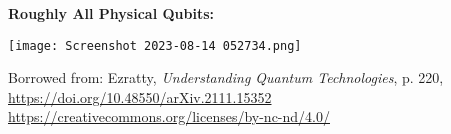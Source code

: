 \huge\begin{center} \textbf{Roughly All Physical Qubits:}
\end{center}


\begin{center}

\texttt{[image: Screenshot 2023-08-14 052734.png]}

\end{center}


\large\begin{center}

Borrowed from: Ezratty, \textit{Understanding Quantum Technologies}, p. 220, \url{https://doi.org/10.48550/arXiv.2111.15352}
\url{https://creativecommons.org/licenses/by-nc-nd/4.0/}

\end{center}
